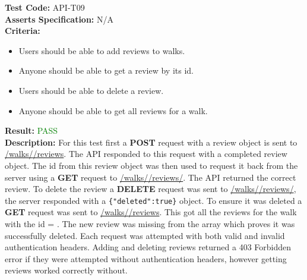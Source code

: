 \documentclass[11pt,a4paper]{report}
\begin{document}
\label{test:API-T09}
\noindent\textbf{Test Code:} API-T09\\
\textbf{Asserts Specification:} N/A \\ 
\textbf{Criteria:} \begin{itemize}
                     \item Users should be able to add reviews to walks. 
                     \item Anyone should be able to get a review by its id.
                     \item Users should be able to delete a review.
                     \item Anyone should be able to get all reviews for a walk.
                   \end{itemize}  
\textbf{Result:} \textcolor{green}{PASS}\\ 
\textbf{Description:} For this test first a \textbf{POST} request with a review object is sent to \url{/walks/}\url{/reviews}. The API responded to this request with a completed review object. The id from this review object was then used to request it back from the server using a \textbf{GET} request to \url{/walks/}\url{/reviews/}. The API returned the correct review. To delete the review a \textbf{DELETE} request was sent to \url{/walks/}\url{/reviews/}, the server responded with a \lstinline${"deleted":true}$ object. To ensure it was deleted a \textbf{GET} request was sent to \url{/walks/}\url{/reviews}. This got all the reviews for the walk with the id = . The new review was missing from the array which proves it was successfully deleted. Each request was attempted with both valid and invalid authentication headers. Adding and deleting reviews returned a 403 Forbidden error if they were attempted without authentication headers, however getting reviews worked correctly without. \\
\end{document}
